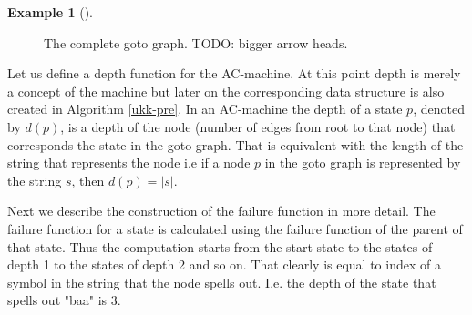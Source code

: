 \documentclass[english,twoside,censored,csm,algorithms-track-2020]{HYthesisML}
\theoremstyle{plain}
\theoremstyle{definition}
\newtheorem{example}[theorem]{Example}
\begin{document}
\begin{example}[]
\begin{figure}[h]
  \caption{The complete goto graph. TODO: bigger arrow heads.} \label{fig-ac-goto}
\end{figure}
  \end{example}
  
  Let us define a depth function for the AC-machine. At this point depth is merely a concept of the
  machine but later on the corresponding data structure is also created in Algorithm \ref{ukk-pre}.
  In an AC-machine the depth of a state $p$, denoted by $d(p)$, is a depth of the node (number of
  edges from root to that node) that corresponds
  the state in the goto graph. That is equivalent with the length of the string that represents the
  node i.e if a node $p$ in the goto graph is represented by the string $s$, then $d(p) = |s|$.
  
  Next we describe the construction of the failure function in more detail. The failure function
  for a state is calculated using the failure function of the parent of that state. Thus the computation
  starts from the start state to the states of depth 1 to the states of depth 2 and so on. That clearly
  is equal to index of a symbol in the string that the node spells out. I.e. the depth of
  the state that spells out "baa" is 3.
\end{document}
